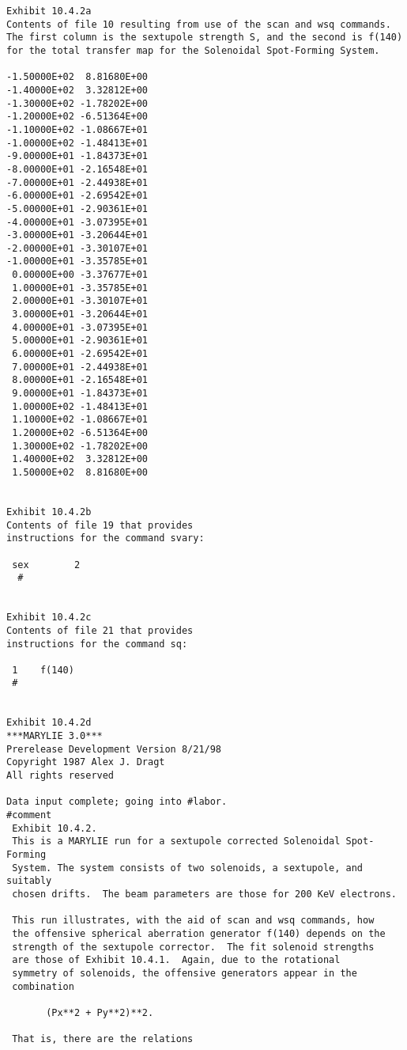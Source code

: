\newpage
\begin{footnotesize}
\begin{verbatim}
Exhibit 10.4.2a
Contents of file 10 resulting from use of the scan and wsq commands.
The first column is the sextupole strength S, and the second is f(140)
for the total transfer map for the Solenoidal Spot-Forming System.

-1.50000E+02  8.81680E+00
-1.40000E+02  3.32812E+00
-1.30000E+02 -1.78202E+00
-1.20000E+02 -6.51364E+00
-1.10000E+02 -1.08667E+01
-1.00000E+02 -1.48413E+01
-9.00000E+01 -1.84373E+01
-8.00000E+01 -2.16548E+01
-7.00000E+01 -2.44938E+01
-6.00000E+01 -2.69542E+01
-5.00000E+01 -2.90361E+01
-4.00000E+01 -3.07395E+01
-3.00000E+01 -3.20644E+01
-2.00000E+01 -3.30107E+01
-1.00000E+01 -3.35785E+01
 0.00000E+00 -3.37677E+01
 1.00000E+01 -3.35785E+01
 2.00000E+01 -3.30107E+01
 3.00000E+01 -3.20644E+01
 4.00000E+01 -3.07395E+01
 5.00000E+01 -2.90361E+01
 6.00000E+01 -2.69542E+01
 7.00000E+01 -2.44938E+01
 8.00000E+01 -2.16548E+01
 9.00000E+01 -1.84373E+01
 1.00000E+02 -1.48413E+01
 1.10000E+02 -1.08667E+01
 1.20000E+02 -6.51364E+00
 1.30000E+02 -1.78202E+00
 1.40000E+02  3.32812E+00
 1.50000E+02  8.81680E+00


Exhibit 10.4.2b
Contents of file 19 that provides
instructions for the command svary:

 sex        2
  #


Exhibit 10.4.2c
Contents of file 21 that provides
instructions for the command sq:

 1    f(140)
 #


Exhibit 10.4.2d
***MARYLIE 3.0***
Prerelease Development Version 8/21/98
Copyright 1987 Alex J. Dragt
All rights reserved

Data input complete; going into #labor.
#comment
 Exhibit 10.4.2.
 This is a MARYLIE run for a sextupole corrected Solenoidal Spot-Forming
 System. The system consists of two solenoids, a sextupole, and suitably
 chosen drifts.  The beam parameters are those for 200 KeV electrons.

 This run illustrates, with the aid of scan and wsq commands, how
 the offensive spherical aberration generator f(140) depends on the
 strength of the sextupole corrector.  The fit solenoid strengths
 are those of Exhibit 10.4.1.  Again, due to the rotational
 symmetry of solenoids, the offensive generators appear in the
 combination

       (Px**2 + Py**2)**2.

 That is, there are the relations


\end{verbatim}
\end{footnotesize}
